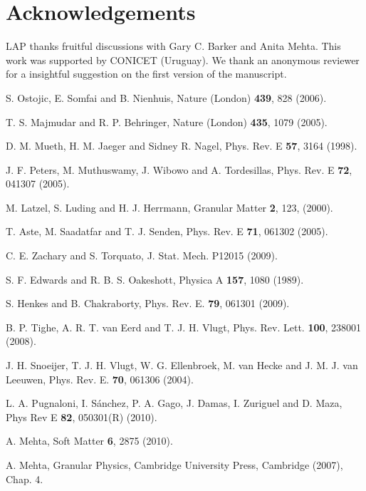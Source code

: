 \section*{Acknowledgements}

LAP thanks fruitful discussions with Gary C. Barker and Anita Mehta. This work was supported by CONICET (Uruguay). We thank an anonymous reviewer for a insightful suggestion on the first version of the manuscript.

%
% 
% 
%
\begin{thebibliography}{50}

 S. Ostojic, E. Somfai and B. Nienhuis, Nature (London) \textbf{439}, 828 (2006).

 T. S. Majmudar and R. P. Behringer, Nature (London) \textbf{435}, 1079 (2005).

 D. M. Mueth, H. M. Jaeger and Sidney R. Nagel, Phys. Rev. E \textbf{57}, 3164 (1998).

 J. F. Peters, M. Muthuswamy, J. Wibowo and A. Tordesillas, Phys. Rev. E \textbf{72}, 041307 (2005).

 M. Latzel, S. Luding and H. J. Herrmann, Granular Matter \textbf{2}, 123, (2000).

 T. Aste, M. Saadatfar and T. J. Senden, Phys. Rev. E \textbf{71}, 061302 (2005).

 C. E. Zachary and S. Torquato, J. Stat. Mech. P12015 (2009).

 S. F. Edwards and R. B. S. Oakeshott, Physica A \textbf{157}, 1080 (1989).

 S. Henkes and B. Chakraborty, Phys. Rev. E. \textbf{79}, 061301 (2009).

 B. P. Tighe, A. R. T. van Eerd and T. J. H. Vlugt, Phys. Rev. Lett. \textbf{100}, 238001 (2008).

 J. H. Snoeijer, T. J. H. Vlugt, W. G. Ellenbroek, M. van Hecke and J. M. J. van Leeuwen, Phys. Rev. E. \textbf{70}, 061306 (2004).

 L. A. Pugnaloni, I. S\'anchez, P. A. Gago, J. Damas, I. Zuriguel and D. Maza, Phys Rev E \textbf{82}, 050301(R) (2010).

 A. Mehta, Soft Matter \textbf{6}, 2875 (2010).

 A. Mehta, Granular Physics, Cambridge University Press, Cambridge (2007), Chap. 4.


\end{thebibliography}
